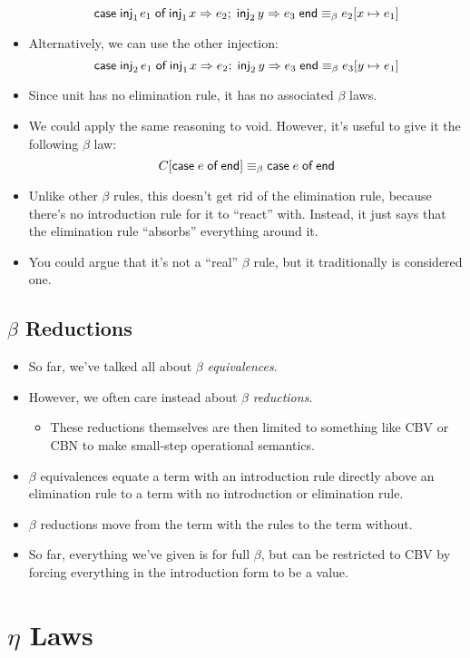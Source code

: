 \documentclass{lecturenotes}
\newcommand{\utype}{\textsf{unit}\xspace}
\newcommand{\injl}[1]{\ensuremath{\textsf{inj}_1\mkern2mu#1}}
\newcommand{\injr}[1]{\ensuremath{\textsf{inj}_2\mkern3mu#1}}
\newcommand{\case}[5]{\ensuremath{\textsf{case}\mkern5mu#1\mkern5mu\textsf{of}\mkern5mu\injl{#2} \Rightarrow #3;\mkern5mu\injr{#4} \Rightarrow #5\mkern5mu\textsf{end}}}
\newcommand{\vtype}{\textsf{void}\xspace}
\newcommand{\vcase}[1]{\ensuremath{\textsf{case}\mkern5mu#1\mkern5mu\textsf{of}\mkern5mu\textsf{end}}}
\begin{document}
\begin{itemize}
  $$\case{\injl{e_1}}{x}{e_2}{y}{e_3} \equiv_\beta e_2[x \mapsto e_1]$$
\item Alternatively, we can use the other injection:
  $$\case{\injr{e_1}}{x}{e_2}{y}{e_3} \equiv_\beta e_3[y \mapsto e_1]$$
\item Since \utype has no elimination rule, it has no associated $\beta$ laws.
\item We could apply the same reasoning to \vtype.
  However, it's useful to give it the following $\beta$ law:
  $$C[\vcase{e}] \equiv_\beta \vcase{e}$$
\item Unlike other $\beta$ rules, this doesn't get rid of the elimination rule, because there's no introduction rule for it to ``react'' with.
  Instead, it just says that the elimination rule ``absorbs'' everything around it.
\item You could argue that it's not a ``real'' $\beta$ rule, but it traditionally is considered one.
\end{itemize}

\subsection{$\beta$ Reductions}
\label{sec:beta-reductions}

\begin{itemize}
\item So far, we've talked all about $\beta$ \emph{equivalences}.
\item However, we often care instead about $\beta$ \emph{reductions}.
  \begin{itemize}
  \item These reductions themselves are then limited to something like CBV or CBN to make small-step operational semantics.
  \end{itemize}
\item $\beta$ equivalences equate a term with an introduction rule directly above an elimination rule to a term with no introduction or elimination rule.
\item $\beta$ reductions move from the term with the rules to the term without.
\item So far, everything we've given is for full $\beta$, but can be restricted to CBV by forcing everything in the introduction form to be a value.
\end{itemize}

\section{$\eta$ Laws}
\label{sec:eta-laws}
\end{document}
